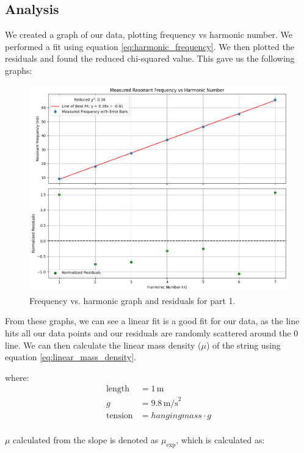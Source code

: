 \documentclass[11pt]{article}
\begin{document}
    
    \subsection{Analysis}\label{subsec:part_1_analysis}
    We created a graph of our data, plotting frequency vs harmonic number.
    We performed a fit using equation \ref{eq:harmonic_frequency}.
    We then plotted the residuals and found the reduced chi-squared value.
    This gave us the following graphs:

    \begin{figure}[H]
        \includegraphics[width=1\textwidth]{resources/images/p1 graphs}
        \caption{Frequency vs. harmonic graph and residuals for part 1.}
        \label{fig:measured_frequency}
    \end{figure}

    From these graphs, we can see a linear fit is a good fit for our data, as the line hits all our data points and our residuals are randomly scattered around the 0 line.
    We can then calculate the linear mass density ($\mu$) of the string using equation \ref{eq:linear_mass_density}.
    
    where:
    \begin{align*}
    \text{length} &= 1 \, \text{m} \\
    g &= 9.8 \, \text{m/s}^2 \\
    \text{tension} &= hanging mass \cdot g\\
    \end{align*}
    
    $\mu$ calculated from the slope is denoted as $\mu_{\text{exp}}$, which is calculated as:
    
\end{document}
